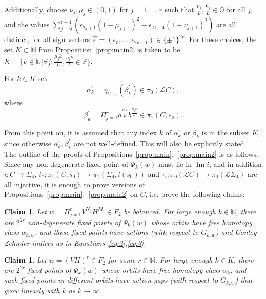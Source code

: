 \documentclass[11pt]{article}
\newtheorem{claim}[theorem]{Claim}
\newcommand{\N}{\mathbb{N}}
\newcommand{\Q}{\mathbb{Q}}
\newcommand{\Z}{\mathbb{Z}}
\DeclareMathOperator{\Ima}{Im}
\begin{document}
            Additionally, choose $\nu_j,\mu_j \in (0,1)$ for $j=1,...,r$ such that $\frac{\nu_j}{L},\frac{\mu_j}{L} \in \Q$ for all $j$, and the values $\sum_{j=0}^{r-1} (\epsilon_{2j+1}(1-\mu_{j+1})^2 - \epsilon_{2j+4}(1-\nu_{j+1})^2)$ are all distinct, for all sign vectors $\vec\epsilon = (\epsilon_0,...,\epsilon_{2r-1}) \in \{\pm 1\}^{2r}$. For these choices, the set $K \subset \N$ from Proposition~\ref{prop:main2} is taken to be $K = \{k \in \N | \forall j: \frac{\mu_j k}{L}, \frac{\nu_j k}{L} \in \Z \}$.
            
            For $k \in K$ set
            \[
                \alpha_k^\prime = \eta_{C,s_0}(\beta_k^\prime) \in \pi_0(\mathscr{L}C) ,
            \]
            where
            \[
                \beta_k^\prime = \Pi_{j=1}^r a^{\frac{\nu_j k}{L}} b^{\frac{\mu_j k}{L}} \in \pi_1(C,s_0) .
            \]
            
            From this point on, it is assumed that any index $k$ of $\alpha_k^\prime$ or $\beta_k^\prime$ is in the subset $K$, since otherwise $\alpha_k^\prime, \beta_k^\prime$ are not well-defined. This will also be explicitly stated. \\
            
            The outline of the proofs of Propositions~\ref{prop:main},~\ref{prop:main2} is as follows. Since any non-degenerate fixed point of $\Phi_k(w)$ must lie in $\Ima i$, and in addition $i: C \to \Sigma_4$, $i_*: \pi_1(C,s_0) \to \pi_1(\Sigma_4,i(s_0))$ and $\tau_i: \pi_0(\mathscr{L}C) \to \pi_0(\mathscr{L}\Sigma_4)$ are all injective, it is enough to prove versions of Propositions~\ref{prop:main},~\ref{prop:main2} on $C$, i.e. prove the following claims:
            \begin{claim}
            \label{cl:2}
                Let $w = \Pi_{j=1}^r V^{N_j} H^{M_j} \in F_2$ be balanced. For large enough $k \in \N$, there are $2^{2r}$ non-degenerate fixed points of $\Psi_k(w)$ whose orbits have free homotopy class $\alpha_{k,w}$, and these fixed points have actions (with respect to $G_{k,w}$) and Conley-Zehnder indices as in Equations~\ref{eq:2},\ref{eq:3}.
            \end{claim}
            
            \begin{claim}
            \label{cl:2.2}
                Let $w = (VH)^r \in F_2$ for some $r \in \N$. For large enough $k \in K$, there are $2^{2r}$ fixed points of $\Psi_k(w)$ whose orbits have free homotopy class $\alpha_k^\prime$, and such fixed points in different orbits have action gaps (with respect to $G_{k,w}$) that grow linearly with $k$ as $k \to \infty$.
            \end{claim}
            
\end{document}
